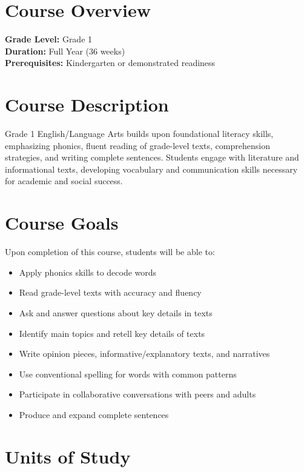 \documentclass[11pt,letterpaper]{report}
\begin{document}
\section{Course Overview}

\textbf{Grade Level:} Grade 1\\
\textbf{Duration:} Full Year (36 weeks)\\
\textbf{Prerequisites:} Kindergarten or demonstrated readiness

\section{Course Description}

Grade 1 English/Language Arts builds upon foundational literacy skills, emphasizing phonics, fluent reading of grade-level texts, comprehension strategies, and writing complete sentences. Students engage with literature and informational texts, developing vocabulary and communication skills necessary for academic and social success.

\section{Course Goals}

Upon completion of this course, students will be able to:

\begin{itemize}
    \item Apply phonics skills to decode words
    \item Read grade-level texts with accuracy and fluency
    \item Ask and answer questions about key details in texts
    \item Identify main topics and retell key details of texts
    \item Write opinion pieces, informative/explanatory texts, and narratives
    \item Use conventional spelling for words with common patterns
    \item Participate in collaborative conversations with peers and adults
    \item Produce and expand complete sentences
\end{itemize}

\section{Units of Study}
\end{document}
